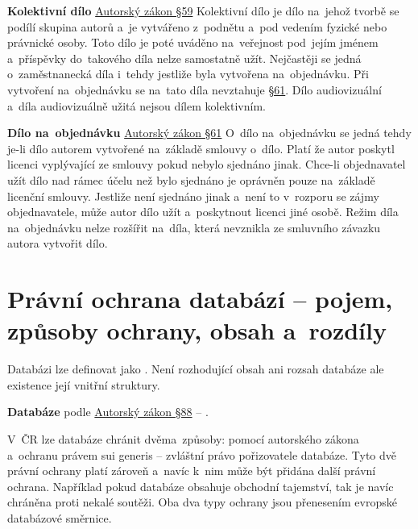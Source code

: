 \vspace{0.3cm}
\textbf{Kolektivní dílo} \href{https://www.zakonyprolidi.cz/cs/2000-121#p59}{Autorský zákon §59}
Kolektivní dílo je dílo na~jehož tvorbě se podílí skupina autorů a~je vytvářeno z~podnětu a~pod vedením fyzické nebo právnické osoby. Toto dílo je poté uváděno na~veřejnost pod~jejím jménem a~příspěvky do~takového díla nelze samostatně užít. Nejčastěji se jedná o~zaměstnanecká díla i~tehdy jestliže byla vytvořena na~objednávku. Při vytvoření na~objednávku se na~tato díla nevztahuje \href{https://www.zakonyprolidi.cz/cs/2000-121#p61}{ §61}. Dílo audiovizuální a~díla audiovizuálně užitá nejsou dílem kolektivním.

\vspace{0.3cm}
\textbf{Dílo na~objednávku} \href{https://www.zakonyprolidi.cz/cs/2000-121#p61}{Autorský zákon §61}
O~dílo na~objednávku se jedná tehdy je-li dílo autorem vytvořené na~základě smlouvy o~dílo. Platí že autor poskytl licenci vyplývající ze smlouvy pokud nebylo sjednáno jinak. Chce-li objednavatel užít dílo nad rámec účelu než bylo sjednáno je oprávněn pouze na~základě licenční smlouvy. Jestliže není sjednáno jinak a~není to v~rozporu se zájmy objednavatele, může autor dílo užít a~poskytnout licenci jiné osobě. Režim díla na~objednávku nelze rozšířit na~díla, která nevznikla ze smluvního závazku autora vytvořit dílo.











\clearpage
\section{Právní ochrana databází -- pojem, způsoby ochrany, obsah a~rozdíly}


Databázi lze definovat jako \emph{}. Není rozhodující obsah ani rozsah databáze ale existence její vnitřní struktury.
\vspace{0.2cm}

\textbf{Databáze} podle \href{https://www.zakonyprolidi.cz/cs/2000-121#p88}{Autorský zákon §88} -- \emph{}.

\vspace{0.3cm}
V~ČR lze databáze chránit dvěma~způsoby: pomocí autorského zákona a~ochranu právem sui generis -- zvláštní právo pořizovatele databáze. Tyto dvě právní ochrany platí zároveň a~navíc k~nim může být přidána další právní ochrana. Například pokud databáze obsahuje obchodní tajemství, tak je navíc chráněna proti nekalé soutěži. Oba dva typy ochrany jsou přenesením evropské databázové směrnice.

